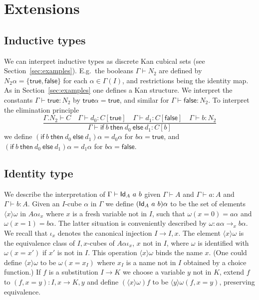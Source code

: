 \documentclass[a4paper,USenglish,draft]{lipics}
\makeatletter
\newcommand{\Id}{{\sf Id}}
\newcommand{\bool}{{N_2}}
\newcommand{\true}{\mathsf{true}}
\newcommand{\false}{\mathsf{false}}
\newcommand{\ifte}[3]{\mathsf{if}\ #1\ \mathsf{then}\ #2\ \mathsf{else}\ #3}
\newcommand{\napp}{\mathop{\boldsymbol{@}}}
\newcommand{\set}[1]{\{#1\}}
\newcommand{\bind}[2]{{\langle}#1{\rangle}#2}
\makeatother
\begin{document}
\section{Extensions}

\subsection{Inductive types}
\label{sec:inductive-types}

We can interpret inductive types as discrete Kan cubical sets (see
Section~\ref{sec:examples}).  E.g.\ the booleans
$\Gamma \vdash \bool$ are defined by $\bool \alpha = \set {\true,
  \false}$ for each $\alpha \in \Gamma (I)$, and restrictions being
the identity map.  As in Section~\ref{sec:examples} one defines a Kan
structure.  We interpret the constants $\Gamma \vdash \true : \bool$
by $\true \alpha = \true$, and similar for $\Gamma \vdash \false :
\bool$.  To interpret the elimination principle
\[
\frac{\Gamma.\bool \vdash C \quad \Gamma \vdash d_0 : C [\true] \quad
  \Gamma \vdash d_1 : C [\false] \quad \Gamma \vdash b : \bool}
{\Gamma \vdash \ifte b {d_0} {d_1} : C[b]}
\]
we define $(\ifte b {d_0} {d_1}) \alpha = d_0 \alpha$ for $b \alpha =
\true$, and $(\ifte b {d_0} {d_1}) \alpha = d_1 \alpha$ for $b \alpha
= \false$.

\subsection{Identity type}
\label{sec:identity-type}

We describe the interpretation of $\Gamma\vdash\Id_A~a~b$ given
$\Gamma\vdash A$ and $\Gamma\vdash a:A$ and $\Gamma\vdash b:A$. Given
an $I$-cube $\alpha$ in $\Gamma$ we define $(\Id_A~a~b)\alpha$ to be
the set of elements $\bind{x}{\omega}$ in $A\alpha\iota_x$ where $x$ is a
fresh variable not in $I$, such that $\omega(x=0) = a\alpha$ and
$\omega(x=1) = b\alpha$. The latter situation is conveniently
described by $\omega: a\alpha\to_x b\alpha$.  We recall that $\iota_x$
denotes the canonical injection $I \to I,x$. The element
$\bind{x}{\omega}$ is the equivalence class of $I,x$-cubes of
$A\alpha \iota_x$, $x$ not in $I$, where $\omega$ is identified with
$\omega(x=x')$ if $x'$ is not in $I$. This operation
$\bind{x}{\omega}$ binds the name $x$.  (One could define
$\bind{x}{\omega}$ to be $\omega(x = x_I)$ where $x_I$ is a name not
in $I$ obtained by a choice function.) If $f$ is a substitution $I \to
K$ we choose a variable $y$ not in $K$, extend $f$ to $(f,x=y): I,x
\to K,y$ and define $(\bind{x}{\omega}) f$ to be $\bind{y}{\omega
  (f,x=y)}$, preserving equivalence.
\end{document}
